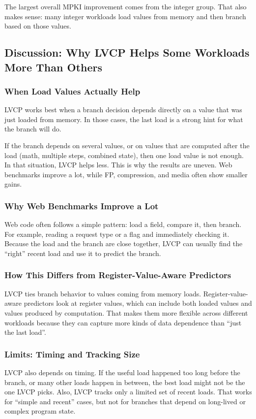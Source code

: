 \documentclass[11pt,a4paper]{article}
\begin{document}
The largest overall MPKI improvement comes from the integer group. That also makes sense: many integer workloads load values from memory and then branch based on those values.

\subsection{Discussion: Why LVCP Helps Some Workloads More Than Others}

\subsubsection{When Load Values Actually Help}
LVCP works best when a branch decision depends directly on a value that was just loaded from memory. In those cases, the last load is a strong hint for what the branch will do.

If the branch depends on several values, or on values that are computed after the load (math, multiple steps, combined state), then one load value is not enough. In that situation, LVCP helps less. This is why the results are uneven. Web benchmarks improve a lot, while FP, compression, and media often show smaller gains.

\subsubsection{Why Web Benchmarks Improve a Lot}
Web code often follows a simple pattern: load a field, compare it, then branch. For example, reading a request type or a flag and immediately checking it. Because the load and the branch are close together, LVCP can usually find the “right” recent load and use it to predict the branch.

\subsubsection{How This Differs from Register-Value-Aware Predictors}
LVCP ties branch behavior to values coming from memory loads. Register-value-aware predictors look at register values, which can include both loaded values and values produced by computation. That makes them more flexible across different workloads because they can capture more kinds of data dependence than “just the last load”.

\subsubsection{Limits: Timing and Tracking Size}
LVCP also depends on timing. If the useful load happened too long before the branch, or many other loads happen in between, the best load might not be the one LVCP picks. Also, LVCP tracks only a limited set of recent loads. That works for “simple and recent” cases, but not for branches that depend on long-lived or complex program state.
\end{document}
